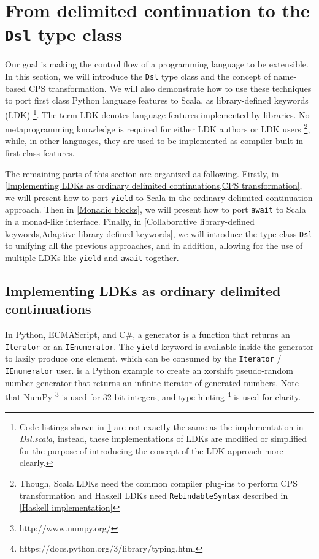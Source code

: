 \section{From delimited continuation to the \lstinline{Dsl} type class}\label{Basic concepts}

Our goal is making the control flow of a programming language to be extensible. In this section, we will introduce the \lstinline{Dsl} type class and the concept of name-based CPS transformation. We will also demonstrate how to use these techniques to port first class Python language features to Scala, as library-defined keywords (LDK) \footnote{Code listings shown in \cref{Basic concepts} are not exactly the same as the implementation in \textit{Dsl.scala}, instead, these implementations of LDKs are modified or simplified for the purpose of introducing the concept of the LDK approach more clearly.}. The term LDK denotes language features implemented by libraries. No metaprogramming knowledge is required for either LDK authors or LDK users \footnote{ Though, Scala LDKs need the common compiler plug-ins to perform CPS transformation and Haskell LDKs need \lstinline{RebindableSyntax} described in \cref{Haskell implementation}}, while, in other languages, they are used to be implemented as compiler built-in first-class features.

The remaining parts of this section are organized as following. Firstly, in \cref{Implementing LDKs as ordinary delimited continuations,CPS transformation}, we will present how to port \lstinline{yield} to Scala in the ordinary delimited continuation approach. Then in \cref{Monadic blocks}, we will present how to port \lstinline{await} to Scala in a monad-like interface. Finally, in \cref{Collaborative library-defined keywords,Adaptive library-defined keywords}, we will introduce the type class \lstinline{Dsl} to unifying all the previous approaches, and in addition, allowing for the use of multiple LDKs like \lstinline{yield} and \lstinline{await} together.

\subsection{Implementing LDKs as ordinary delimited continuations}\label{Implementing LDKs as ordinary delimited continuations}

In Python, ECMAScript, and C\#, a generator is a function that returns an \lstinline{Iterator} or an \lstinline{IEnumerator}. The \lstinline{yield} keyword is available inside the generator to lazily produce one element, which can be consumed by the \lstinline{Iterator} / \lstinline{IEnumerator} user.  is a Python example to create an xorshift \cite{marsaglia2003xorshift} pseudo-random number generator that returns an infinite iterator of generated numbers. Note that NumPy \footnote{http://www.numpy.org/} is used for 32-bit integers, and type hinting \footnote{https://docs.python.org/3/library/typing.html} is used for clarity.

